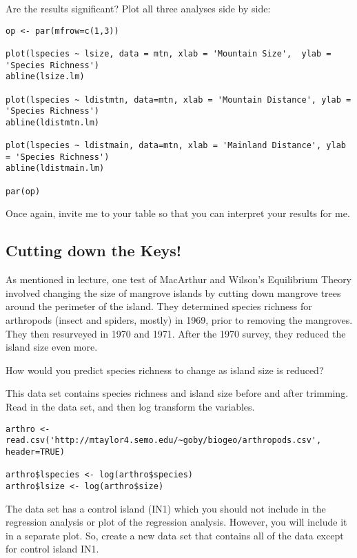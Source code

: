 \documentclass[11pt]{article}
\begin{document}
Are the results significant?  Plot all three analyses side by side:

\begin{verbatim}
op <- par(mfrow=c(1,3))

plot(lspecies ~ lsize, data = mtn, xlab = 'Mountain Size',  ylab = 'Species Richness')
abline(lsize.lm)

plot(lspecies ~ ldistmtn, data=mtn, xlab = 'Mountain Distance', ylab = 'Species Richness')
abline(ldistmtn.lm)

plot(lspecies ~ ldistmain, data=mtn, xlab = 'Mainland Distance', ylab = 'Species Richness')
abline(ldistmain.lm)

par(op)
\end{verbatim}

Once again, invite me to your table so that you can interpret your results for me.

\subsection*{Cutting down the Keys!}

As mentioned in lecture, one test of MacArthur and Wilson's Equilibrium Theory involved changing the size of mangrove islands by cutting down mangrove trees around the perimeter of the island.  They determined species richness for arthropods (insect and spiders, mostly) in 1969, prior to removing the mangroves. They then resurveyed in 1970 and 1971.  After the 1970 survey, they reduced the island size even more. 

How would you predict species richness to change as island size is reduced?

This data set contains species richness and island size before and after trimming.  Read in the data set, and then log transform the variables.

\begin{verbatim}
arthro <- read.csv('http://mtaylor4.semo.edu/~goby/biogeo/arthropods.csv', header=TRUE)

arthro$lspecies <- log(arthro$species)
arthro$lsize <- log(arthro$size)

\end{verbatim}

The data set has a control island (IN1) which you should not include in the regression analysis or plot of the regression analysis.  However, you will include it in a separate plot.  So,  create a new data set that contains all of the data except for control island IN1.
\end{document}
